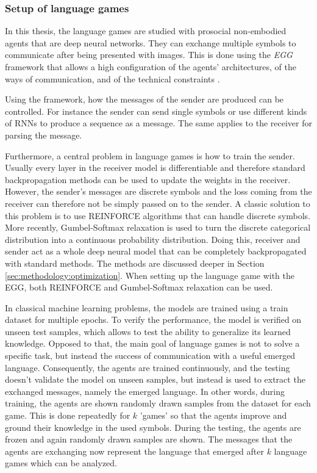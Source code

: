 \subsubsection{Setup of language games}
\label{sec:background:lg:setup}
In this thesis, the language games are studied with prosocial non-embodied agents that are deep neural networks.
They can exchange multiple symbols to communicate after being presented with images.
This is done using the \emph{EGG} framework that allows a high configuration of the agents' architectures, of the ways of communication, and of the technical constraints \citep{Kharitonov2019}.

Using the framework, how the messages of the sender are produced can be controlled.
For instance the sender can send single symbols or use different kinds of RNNs to produce a sequence as a message.
The same applies to the receiver for parsing the message.

Furthermore, a central problem in language games is how to train the sender.
Usually every layer in the receiver model is differentiable and therefore standard backpropagation methods can be used to update the weights in the receiver.
However, the sender's messages are discrete symbols and the loss coming from the receiver can therefore not be simply passed on to the sender.
A classic solution to this problem is to use REINFORCE algorithms \citep{Williams1992} that can handle discrete symbols.
More recently, Gumbel-Softmax relaxation \citep{Jang2017} is used to turn the discrete categorical distribution into a continuous probability distribution.
Doing this, receiver and sender act as a whole deep neural model that can be completely backpropagated with standard methods.
The methods are discussed deeper in Section \ref{sec:methodology:optimization}.
When setting up the language game with the EGG, both REINFORCE and Gumbel-Softmax relaxation can be used.

In classical machine learning problems, the models are trained using a train dataset for multiple epochs.
To verify the performance, the model is verified on unseen test samples, which allows to test the ability to generalize its learned knowledge.
Opposed to that, the main goal of language games is not to solve a specific task, but instead the success of communication with a useful emerged language.
Consequently, the agents are trained continuously, and the testing doesn't validate the model on unseen samples, but instead is used to extract the exchanged messages, namely the emerged language.
In other words, during training, the agents are shown randomly drawn samples from the dataset for each game.
This is done repeatedly for $k$ 'games' so that the agents improve and ground their knowledge in the used symbols.
During the testing, the agents are frozen and again randomly drawn samples are shown.
The messages that the agents are exchanging now represent the language that emerged after $k$ language games which can be analyzed.

